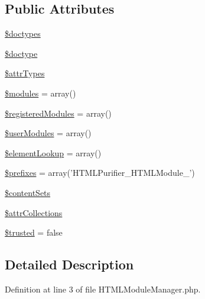 \subsection*{Public Attributes}
\begin{DoxyCompactItemize}
\item 
\hyperlink{classHTMLPurifier__HTMLModuleManager_a94b1b82d8a2873995d6f0e7348e960d0}{\$doctypes}
\item 
\hyperlink{classHTMLPurifier__HTMLModuleManager_aaeffccf938152286738d5c3466eae2b5}{\$doctype}
\item 
\hyperlink{classHTMLPurifier__HTMLModuleManager_ae71132f5eb2e1999b9c2e9d19a00da77}{\$attr\+Types}
\item 
\hyperlink{classHTMLPurifier__HTMLModuleManager_a1dad6984fd384aa80f545c0323e8b18f}{\$modules} = array()
\item 
\hyperlink{classHTMLPurifier__HTMLModuleManager_ac7baacae235048bc75eeb962de4fd096}{\$registered\+Modules} = array()
\item 
\hyperlink{classHTMLPurifier__HTMLModuleManager_acb5e35e4049e59fda2f13e974211f420}{\$user\+Modules} = array()
\item 
\hyperlink{classHTMLPurifier__HTMLModuleManager_a9e6c47d3f347bb0d09116b4ac5fce29e}{\$element\+Lookup} = array()
\item 
\hyperlink{classHTMLPurifier__HTMLModuleManager_ada129f26d42ceea1c83cd771b0fdb261}{\$prefixes} = array('H\+T\+M\+L\+Purifier\+\_\+\+H\+T\+M\+L\+Module\+\_\+')
\item 
\hyperlink{classHTMLPurifier__HTMLModuleManager_aa756a5b18c58d609963a2302e5c569a1}{\$content\+Sets}
\item 
\hyperlink{classHTMLPurifier__HTMLModuleManager_a8c0860d983146ac2086afb8cc4fefbd1}{\$attr\+Collections}
\item 
\hyperlink{classHTMLPurifier__HTMLModuleManager_ac672c14e87065bab6cbc76edcda40315}{\$trusted} = false
\end{DoxyCompactItemize}


\subsection{Detailed Description}


Definition at line 3 of file H\+T\+M\+L\+Module\+Manager.\+php.



